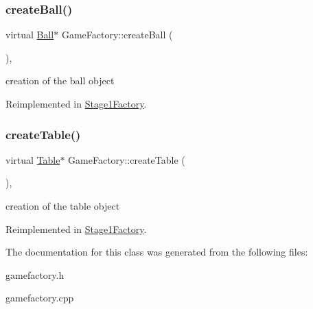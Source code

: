 \subsubsection{\texorpdfstring{create\+Ball()}{createBall()}}
{\footnotesize\ttfamily virtual \mbox{\hyperlink{class_ball}{Ball}}$\ast$ Game\+Factory\+::create\+Ball (\begin{DoxyParamCaption}{ }\end{DoxyParamCaption})\hspace{0.3cm}{\ttfamily [inline]}, {\ttfamily [virtual]}}

creation of the ball object 

Reimplemented in \mbox{\hyperlink{class_stage1_factory_a84b6d3dc3f6500cdc128bb553dacd4cc}{Stage1\+Factory}}.

\mbox{\label{class_game_factory_ac2e32aa1f1c55aae847745575afb0583}} 
\subsubsection{\texorpdfstring{create\+Table()}{createTable()}}
{\footnotesize\ttfamily virtual \mbox{\hyperlink{class_table}{Table}}$\ast$ Game\+Factory\+::create\+Table (\begin{DoxyParamCaption}{ }\end{DoxyParamCaption})\hspace{0.3cm}{\ttfamily [inline]}, {\ttfamily [virtual]}}

creation of the table object 

Reimplemented in \mbox{\hyperlink{class_stage1_factory_ad1a070c87d52b00654125bd9f439cf26}{Stage1\+Factory}}.



The documentation for this class was generated from the following files\+:\begin{DoxyCompactItemize}
\item 
gamefactory.\+h\item 
gamefactory.\+cpp\end{DoxyCompactItemize}
